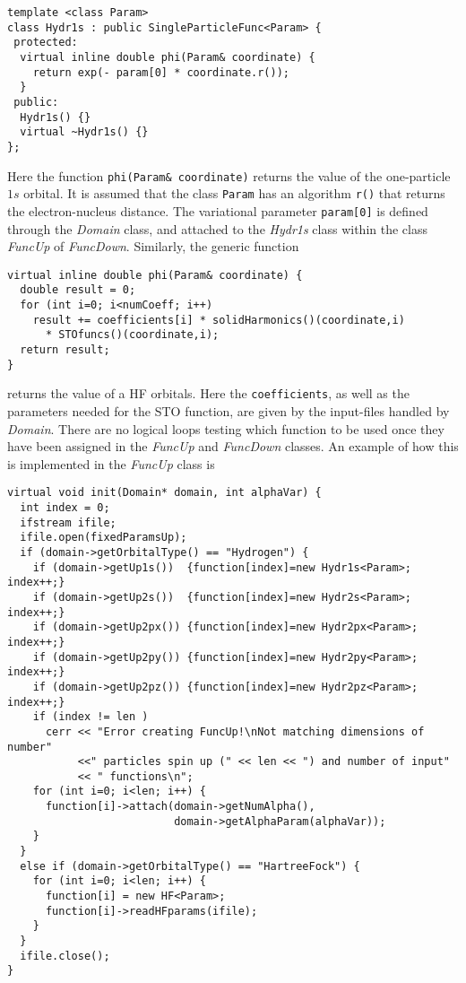 \begin{lstlisting}
template <class Param>
class Hydr1s : public SingleParticleFunc<Param> {
 protected:
  virtual inline double phi(Param& coordinate) {
    return exp(- param[0] * coordinate.r());
  }
 public:
  Hydr1s() {}
  virtual ~Hydr1s() {}
};
\end{lstlisting}

Here the function \lstinline$phi(Param& coordinate)$
returns the value of the one-particle $1s$ orbital. It is assumed that 
the class \lstinline$Param$ has an algorithm \lstinline$r()$ that
returns the electron-nucleus distance. The variational
parameter \lstinline$param[0]$ is defined through the \emph{Domain}
class, and attached to the \emph{Hydr1s} class within the class
\emph{FuncUp} of \emph{FuncDown}.
Similarly, the generic function

\begin{lstlisting}
virtual inline double phi(Param& coordinate) {
  double result = 0;
  for (int i=0; i<numCoeff; i++)
    result += coefficients[i] * solidHarmonics()(coordinate,i)
      * STOfuncs()(coordinate,i);
  return result;
}
\end{lstlisting}

returns the value of a HF orbitals. Here the 
\lstinline$coefficients$, as well as the parameters needed for
the STO function, are given by the input-files handled by
\emph{Domain}. There are no logical loops testing which function to be
used once they have been assigned in the \emph{FuncUp} and 
\emph{FuncDown} classes. An example of how this is implemented in the
\emph{FuncUp} class is

\begin{lstlisting}
virtual void init(Domain* domain, int alphaVar) {
  int index = 0;
  ifstream ifile;
  ifile.open(fixedParamsUp);
  if (domain->getOrbitalType() == "Hydrogen") {
    if (domain->getUp1s())  {function[index]=new Hydr1s<Param>;  index++;}
    if (domain->getUp2s())  {function[index]=new Hydr2s<Param>;  index++;}
    if (domain->getUp2px()) {function[index]=new Hydr2px<Param>; index++;}
    if (domain->getUp2py()) {function[index]=new Hydr2py<Param>; index++;}
    if (domain->getUp2pz()) {function[index]=new Hydr2pz<Param>; index++;}
    if (index != len )
      cerr << "Error creating FuncUp!\nNot matching dimensions of number"
           <<" particles spin up (" << len << ") and number of input"
           << " functions\n";
    for (int i=0; i<len; i++) {
      function[i]->attach(domain->getNumAlpha(),
                          domain->getAlphaParam(alphaVar));
    }
  }
  else if (domain->getOrbitalType() == "HartreeFock") {
    for (int i=0; i<len; i++) {
      function[i] = new HF<Param>;
      function[i]->readHFparams(ifile);
    }
  }
  ifile.close();
}
\end{lstlisting}

